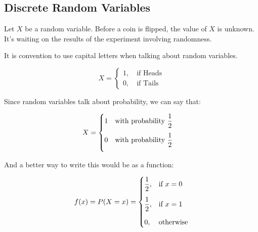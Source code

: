 
\subsection{Discrete Random Variables}
Let $X$ be a random variable. Before a coin is flipped, the value of $X$ is unknown. It's waiting on the results of the experiment involving randomness.

It is convention to use capital letters when talking about random variables.

\begin{equation}
    X=\begin{cases}1, \quad \text{if Heads} \\
        0, \quad \text{if Tails}\end{cases}
\end{equation}

Since random variables talk about probability, we can say that:

\begin{equation}
    X = \begin{cases}
        \vspace{0.25cm} 1 \quad \text{with probability } \dfrac{1}{2} \\
        \vspace{0.25cm} 0 \quad \text{with probability } \dfrac{1}{2}
    \end{cases}
\end{equation}

And a better way to write this would be as a function:

\begin{equation}
    f(x) = P(X=x) = \begin{cases}
        \vspace{0.3cm} \dfrac{1}{2}, & \text{if } x = 0 \\
        \vspace{0.3cm} \dfrac{1}{2}, & \text{if } x = 1 \\
        0,                           & \text{otherwise}
    \end{cases}
\end{equation}

